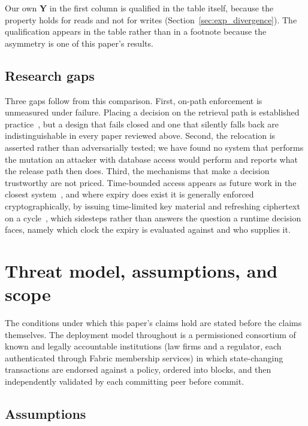 \documentclass[preprint,12pt]{elsarticle}
\begin{document}
Our own \textbf{Y} in the first column is qualified in the table itself,
because the property holds for reads and not for writes
(Section~\ref{sec:exp_divergence}). The qualification appears in the table
rather than in a footnote because the asymmetry is one of this paper's
results.

\subsection{Research gaps}
\label{sec:gaps}

Three gaps follow from this comparison. First, on-path enforcement is
unmeasured under failure. Placing a decision on the retrieval path is
established practice~\cite{steichen2018blockchain,liu2026rbacipfs}, but a
design that fails closed and one that silently falls back are indistinguishable
in every paper reviewed above. Second, the relocation is asserted rather than
adversarially tested; we have found no system that performs the mutation an
attacker with database access would perform and reports what the release path
then does. Third, the mechanisms that make a decision trustworthy are not
priced. Time-bounded access appears as future work in the closest
system~\cite{liu2026rbacipfs}, and where expiry does exist it is generally
enforced cryptographically, by issuing time-limited key material and refreshing
ciphertext on a cycle~\cite{cai2023timebound}, which sidesteps rather than
answers the question a runtime decision faces, namely which clock the expiry is
evaluated against and who supplies it.


\section{Threat model, assumptions, and scope}
\label{sec:threat_model}

The conditions under which this paper's claims hold are stated before the
claims themselves. The deployment model throughout is a permissioned consortium of
known and legally accountable institutions (law firms and a regulator, each
authenticated through Fabric membership services) in which state-changing
transactions are endorsed against a policy, ordered into blocks, and then
independently validated by each committing peer before commit.

\subsection{Assumptions}
\label{sec:assumptions}
\end{document}
